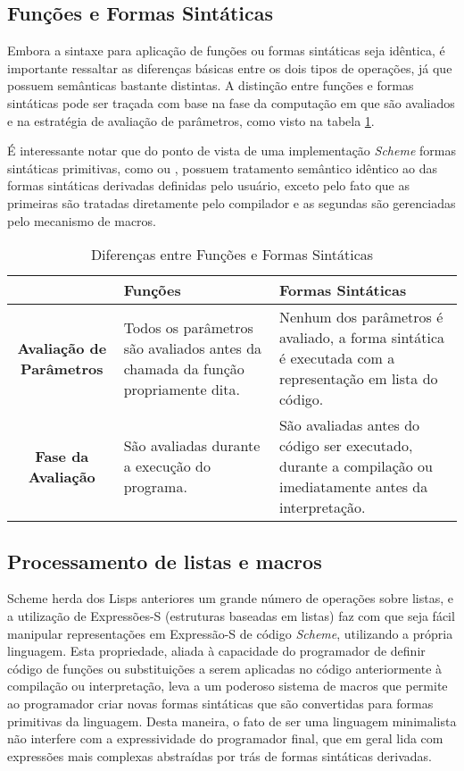 \subsection{Funções e Formas Sintáticas}

Embora a sintaxe para aplicação de funções ou formas sintáticas seja idêntica,
é importante ressaltar as diferenças básicas entre os dois tipos de operações,
já que possuem semânticas bastante distintas. A distinção entre funções e
formas sintáticas pode ser traçada com base na fase da computação em que são
avaliados e na estratégia de avaliação de parâmetros, como visto na tabela
\ref{table:functions-vs-special-forms}.

É interessante notar que do ponto de vista de uma implementação \textit{Scheme}
formas sintáticas primitivas, como  ou , possuem
tratamento semântico idêntico ao das formas sintáticas derivadas definidas pelo
usuário, exceto pelo fato que as primeiras são tratadas diretamente pelo
compilador e as segundas são gerenciadas pelo mecanismo de macros.

\begin{table}[h!]
 \begin{center}
  \begin{tabular} { | c | p{4cm} | p{4cm} | }
   \hline
                        & \textbf{Funções} & \textbf{Formas Sintáticas} \\ \hline
    \textbf{Avaliação de Parâmetros} & Todos os parâmetros são avaliados antes da chamada da função propriamente dita. & Nenhum dos parâmetros é avaliado, a forma sintática é executada com a representação em lista do código. \\ \hline
    \textbf{Fase da Avaliação} & São avaliadas durante a execução do programa. & São avaliadas antes do código ser executado, durante a compilação ou imediatamente antes da interpretação. \\ \hline
  \end{tabular}
 \end{center}
 \caption{Diferenças entre Funções e Formas Sintáticas} 
 \label{table:functions-vs-special-forms}
\end{table}

\subsection{Processamento de listas e macros}

Scheme herda dos Lisps anteriores um grande número de operações sobre listas, e
a utilização de Expressões-S (estruturas baseadas em listas) faz com que seja
fácil manipular representações em Expressão-S de código \textit{Scheme},
utilizando a própria linguagem. Esta propriedade, aliada à capacidade do
programador de definir código de funções ou substituições a serem aplicadas no
código anteriormente à compilação ou interpretação, leva a um poderoso sistema
de macros que permite ao programador criar novas formas sintáticas que são
convertidas para formas primitivas da linguagem. Desta maneira, o fato de ser
uma linguagem minimalista não interfere com a expressividade do programador
final, que em geral lida com expressões mais complexas abstraídas por trás de
formas sintáticas derivadas.

